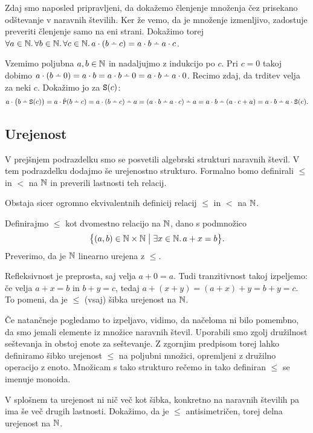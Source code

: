 Zdaj smo naposled pripravljeni, da dokažemo členjenje množenja čez prisekano odštevanje v naravnih številih. Ker že vemo, da je množenje izmenljivo, zadostuje preveriti členjenje samo na eni strani. Dokažimo torej $\all{a \in \NN}\all{b \in \NN}\all{c \in \NN}{a \cdot (b \monus c) = a \cdot b \monus a \cdot c}$.

Vzemimo poljubna $a, b \in \mathbb{N}$ in nadaljujmo z indukcijo po $c$. Pri $c = 0$ takoj dobimo $a \cdot (b \monus 0) = a \cdot b = a \cdot b \monus 0 = a \cdot b \monus a \cdot 0$. Recimo zdaj, da trditev velja za neki $c$. Dokažimo jo za $\mathtt{S}(c)$:
\[a \cdot \big(b \monus \suc(c)\big) = a \cdot \tprd(b \monus c) = a \cdot (b \monus c) \monus a = (a \cdot b \monus a \cdot c) \monus a = a \cdot b \monus (a \cdot c + a) = a \cdot b \monus a \cdot \suc(c).\]

\subsection{Urejenost}

V prejšnjem podrazdelku smo se posvetili algebrski strukturi naravnih števil. V tem podrazdelku dodajmo še urejenostno strukturo. Formalno bomo definirali $\leq$ in $<$ na $\mathbb{N}$ in preverili lastnosti teh relacij.

Obstaja sicer ogromno ekvivalentnih definicij relacij $\leq$ in $<$ na $\mathbb{N}$. 

Definirajmo $\leq$ kot dvomestno relacijo na $\mathbb{N}$, dano s podmnožico
\[\set[1]{(a, b) \in \NN \times \NN}{\some{x \in \NN}{a + x = b}}.\]
Preverimo, da je $\mathbb{N}$ linearno urejena z $\leq$.

Refleksivnost je preprosta, saj velja $a + 0 = a$. Tudi tranzitivnost takoj izpeljemo: če velja $a + x = b$ in $b + y = c$, tedaj $a + (x + y) = (a + x) + y = b + y = c$. To pomeni, da je $\leq$ (vsaj) šibka urejenost na $\mathbb{N}$.

Če natančneje pogledamo to izpeljavo, vidimo, da načeloma ni bilo pomembno, da smo jemali elemente iz množice naravnih števil. Uporabili smo zgolj družilnost seštevanja in obstoj enote za seštevanje. Z zgornjim predpisom torej lahko definiramo šibko urejenost $\leq$ na poljubni množici, opremljeni z družilno operacijo z enoto. Množicam s tako strukturo rečemo  in tako definiran $\leq$ se imenuje  monoida.

V splošnem ta urejenost ni nič več kot šibka, konkretno na naravnih številih pa ima še več drugih lastnosti. Dokažimo, da je $\leq$ antisimetričen, torej delna urejenost na $\mathbb{N}$.

